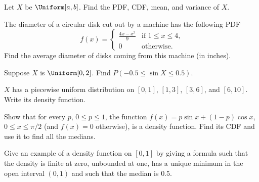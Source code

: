 \begin{problem}[Handout 12, \# 2]
  Let \(X\) be \(\Uniform[a,b]\). Find the PDF, CDF, mean, and variance of
  \(X\).
\end{problem}
\begin{solution}

\end{solution}
\newpage

\begin{problem}[Handout 12, \# 8]
  The diameter of a circular disk cut out by a machine has the following
  PDF
  \[
    f(x)=\begin{cases}
      \displaystyle\frac{4x-x^2}{9}&\text{if \(1\leq x\leq 4\),}\\
      0&\text{otherwise.}
    \end{cases}
  \]
  Find the average diameter of disks coming from this machine (in inches).
\end{problem}
\begin{solution}

\end{solution}
\newpage

\begin{problem}[Handout 12, \# 9]
  Suppose \(X\) is \(\Uniform[0,2]\). Find \(P(-0.5\leq \sin X\leq 0.5)\).
\end{problem}
\begin{solution}

\end{solution}
\newpage

\begin{problem}[Handout 12, \# 13]
  \(X\) has a piecewise uniform distribution on \([0,1]\), \([1,3]\),
  \([3,6]\), and \([6,10]\). Write its density function.
\end{problem}
\begin{solution}

\end{solution}
\newpage

\begin{problem}[Handout 12, \# 16]
  Show that for every \(p\), \(0\leq p\leq 1\), the function \(f(x)=p\sin
  x+(1-p)\cos x\), \(0\leq x\leq\pi/2\) (and \(f(x)=0\) otherwise), is a
  density function. Find its CDF and use it to find all the medians.
\end{problem}
\begin{solution}

\end{solution}
\newpage

\begin{problem}[Handout 12, \# 17]
  Give an example of a density function on \([0,1]\) by giving a formula
  such that the density is finite at zero, unbounded at one, has a unique
  minimum in the open interval \((0,1)\) and such that the median is
  \(0.5\).
\end{problem}
\begin{solution}

\end{solution}
\newpage

